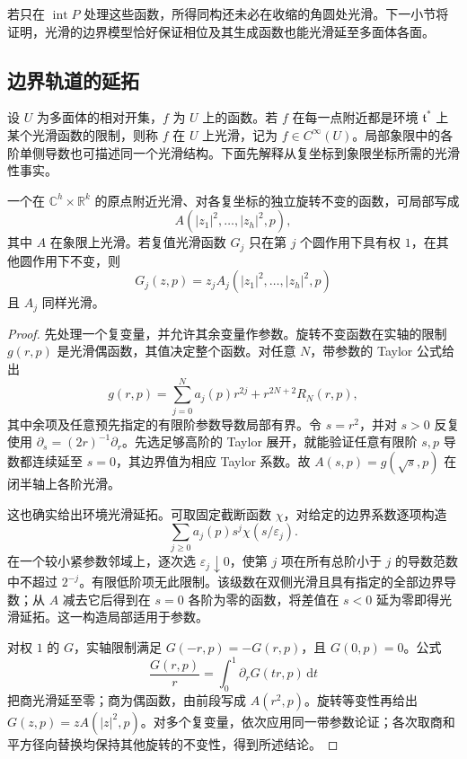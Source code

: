 若只在 \(\operatorname{int}P\) 处理这些函数，所得同构还未必在收缩的角圆处光滑。下一小节将证明，光滑的边界模型恰好保证相位及其生成函数也能光滑延至多面体各面。

\subsection{边界轨道的延拓}
\label{g4:subsec:1204:03}
设 \(U\) 为多面体的相对开集，\(f\) 为 \(U\) 上的函数。若 \(f\) 在每一点附近都是环境 \(\mathfrak t^*\) 上某个光滑函数的限制，则称 \(f\) 在 \(U\) 上光滑，记为 \(f\in C^\infty(U)\)。局部象限中的各阶单侧导数也可描述同一个光滑结构。下面先解释从复坐标到象限坐标所需的光滑性事实。

\begin{lemma}\label{g4:lem:1204:radial-division}
	一个在 \(\mathbb C^h\times\mathbb R^k\) 的原点附近光滑、对各复坐标的独立旋转不变的函数，可局部写成
	\[
		A(|z_1|^2,\ldots,|z_h|^2,p),
	\]
	其中 \(A\) 在象限上光滑。若复值光滑函数 \(G_j\) 只在第 \(j\) 个圆作用下具有权 \(1\)，在其他圆作用下不变，则
	\[
		G_j(z,p)=z_j A_j(|z_1|^2,\ldots,|z_h|^2,p)
	\]
	且 \(A_j\) 同样光滑。
\end{lemma}
\begin{proof}
	先处理一个复变量，并允许其余变量作参数。旋转不变函数在实轴的限制 \(g(r,p)\) 是光滑偶函数，其值决定整个函数。对任意 \(N\)，带参数的 Taylor 公式给出
	\[
		g(r,p)=\sum_{j=0}^{N}a_j(p)r^{2j}+r^{2N+2}R_N(r,p),
	\]
	其中余项及任意预先指定的有限阶参数导数局部有界。令 \(s=r^2\)，并对 \(s>0\) 反复使用 \(\partial_s=(2r)^{-1}\partial_r\)。先选足够高阶的 Taylor 展开，就能验证任意有限阶 \(s,p\) 导数都连续延至 \(s=0\)，其边界值为相应 Taylor 系数。故 \(A(s,p)=g(\sqrt s,p)\) 在闭半轴上各阶光滑。

	这也确实给出环境光滑延拓。可取固定截断函数 \(\chi\)，对给定的边界系数逐项构造
	\[
		\sum_{j\ge0}a_j(p)s^j\chi(s/\varepsilon_j).
	\]
	在一个较小紧参数邻域上，逐次选 \(\varepsilon_j\downarrow0\)，使第 \(j\) 项在所有总阶小于 \(j\) 的导数范数中不超过 \(2^{-j}\)。有限低阶项无此限制。该级数在双侧光滑且具有指定的全部边界导数；从 \(A\) 减去它后得到在 \(s=0\) 各阶为零的函数，将差值在 \(s<0\) 延为零即得光滑延拓。这一构造局部适用于参数。

	对权 \(1\) 的 \(G\)，实轴限制满足 \(G(-r,p)=-G(r,p)\)，且 \(G(0,p)=0\)。公式
	\[
		\frac{G(r,p)}r=\int_0^1\partial_rG(tr,p)\,\mathrm{d}t
	\]
	把商光滑延至零；商为偶函数，由前段写成 \(A(r^2,p)\)。旋转等变性再给出 \(G(z,p)=zA(|z|^2,p)\)。对多个复变量，依次应用同一带参数论证；各次取商和平方径向替换均保持其他旋转的不变性，得到所述结论。
\end{proof}

